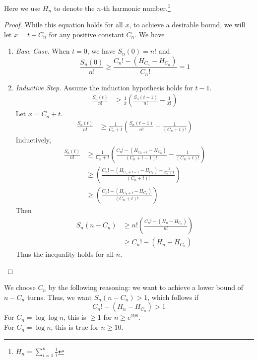 \documentclass[12pt, a4paper]{article}
\begin{document}
	Here we use $H_n$ to denote the $n$-th harmonic number.\footnote{$H_n=\sum_{i = 1}
	^n\frac{1}{i}$}
		\begin{proof}
		While this equation holds for all $x$, to achieve a desirable bound, we will
		let $x=t+C_{n}$ for any positive constant $C_{n}$. We have
		\begin{enumerate}[label=]
		\item\textit{Base Case.} When $t=0$, we have $S_n(0)= n!$ and
			\begin{equation*}
			\frac{S_{n}(0)}{n!}\ge \frac{C_{n}! - (H_{C_{n}}-H_{C_{n}})}{C_{n}!} = 1
			\end{equation*}
			
		\item \textit{Inductive Step.} Assume the induction hypothesis holds for $t-1$.
			\begin{align*}
			\frac{S_{n}(t)}{n!}
			& \ge \frac{1}{x}\left(\frac{S_{n}(t-1)}{n!}-\frac{1}{x!}\right)
			\end{align*}
		Let $x=C_{n}+t$.
			\begin{align*}
			\frac{S_{n}(t)}{n!}
			& \ge \frac{1}{C_{n}+t}\left(\frac{S_{n}(t-1)}{n!}
			-\frac{1}{(C_{n}+t)!}\right)
			\end{align*}
		Inductively,
			\begin{align*}
			\frac{S_{n}(t)}{n!}
			& \ge \frac{1}{C_{n}+t}\left(\frac{C_{n}!-(H_{C_{n}+t} - H_{C_{n}})}
			{(C_{n}+t-1)!} - \frac{1}{(C_{n}+t)!}\right)\\
			& \ge \left(\frac{C_{n}! - (H_{C_{n}+t-1} - H_{C_{n}}) - \frac{1}{C_{n}+t}}
			{(C_{n}+t)!}\right)\\
			& \ge \left(\frac{C_{n}! - (H_{C_{n}+t} - H_{C_{n}})}{(C_{n}+t)!}\right)
			\end{align*}
			Then
			\begin{align*}
			S_{n}(n-C_{n}) & \ge n!\left(\frac{C_{n}! - (H_n - H_{C_{n}})}{n!}\right)\\
			& \ge C_{n}! - (H_n-H_{C_{n}})
			\end{align*}
		Thus the inequality holds for all $n$.
		\end{enumerate}
		\end{proof}
		We choose $C_{n}$ by the following reasoning: we want to achieve a lower bound
		of $n-C_{n}$ turns. Thus, we want $S_n(n-C_{n})>1$, which follows if
		\begin{equation*}
		C_{n}! - (H_n - H_{C_{n}}) > 1
		\end{equation*}
		For $C_{n}=\log\log n$, this is $\ge 1$ for $n\ge e^{198}$.\\
		For $C_{n}=\log n$, this is true for $n\ge 10$.
		
\end{document}
